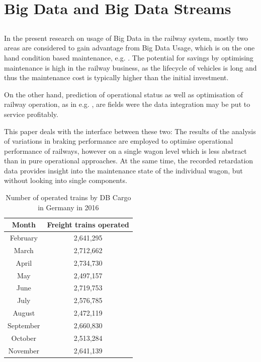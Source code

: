 \documentclass[a4paper, 12pt]{scrartcl}
\begin{document}
\section{Big Data and Big Data Streams}
\subsection{}
In the present research on usage of Big Data in the railway system, mostly two areas are considered to gain advantage from Big Data Usage, which is on the one hand condition based maintenance, e.g. \cite{fumeo2015condition, thaduri2015railway, elsen:Cray}. The potential for savings by optimising maintenance is high in the railway business, as the lifecycle of vehicles is long and thus the maintenance cost is typically higher than the initial investment.

On the other hand, prediction of operational status as well as optimisation of railway operation, as in e.g. \cite{papa2016delay, oneto2016delay, elsen:ISC17}, are fields were the data integration may be put to service profitably.

This paper deals with the interface between these two: The results of the analysis of variations in braking performance are employed to optimise operational performance of railways, however on a single wagon level which is less abstract than in pure operational approaches. At the same time, the recorded retardation data  provides insight into the maintenance state of the individual wagon, but without looking into single components.

\begin{table}  
	\begin{center}  
	\caption{Number of operated trains by DB Cargo in Germany in 2016}
	\label{Tab:Zugfahrten}
	\begin{tabular}{|c|c|}
		\hline
		\textbf{Month}	& \textbf{Freight trains operated} \\ \hline
		February & 2,641,295 \\ \hline
		March & 2,712,662 \\ \hline
		April & 2,734,730 \\ \hline
		May & 2,497,157 \\ \hline
		June & 2,719,753 \\ \hline
		July & 2,576,785 \\ \hline
		August & 2,472,119 \\ \hline
		September & 2,660,830 \\ \hline
		October & 2,513,284 \\ \hline
		November & 2,641,139 \\ \hline 
	\end{tabular}
	\end{center}
\end{table}
\end{document}
